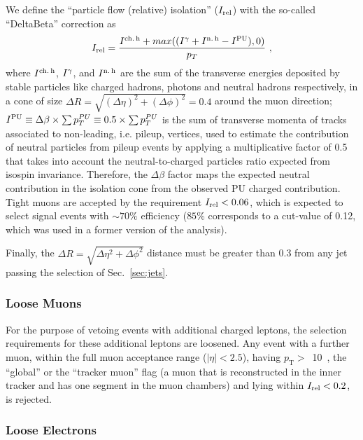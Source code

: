  We define the ``particle flow (relative) isolation'' ($I_{\mathrm{rel}}$) with the so-called ``DeltaBeta'' correction as
 \begin{equation}
 I_{\mathrm{rel}} = \frac{ I^{\mathrm{ch.\,h}} + max((I^{\gamma} + I^{\mathrm{n.\,h}} - I^{\mathrm{PU}}),0)}{p_T}~,
 \label{eq:pfreliso}
 \end{equation}
 where $I^{\mathrm{ch.\,h}}$, $I^{\gamma}$, and $I^{\mathrm{n.\,h}}$ are the sum of the transverse energies deposited by stable particles like charged hadrons, photons and neutral hadrons respectively, in a cone of size $\Delta R = \sqrt{(\Delta\eta)^2+(\Delta\phi)^2} = 0.4$ around the muon direction; $I^{\mathrm{PU}} \equiv \Delta\beta \times \sum p_T^{PU} \equiv 0.5 \times \sum p_T^{PU}$ is the sum of transverse momenta of tracks associated to non-leading, i.e. pileup, vertices, used to estimate the contribution of neutral particles from pileup events by applying a multiplicative factor of 0.5 that takes into account the neutral-to-charged particles ratio expected from isospin invariance. Therefore, the $\Delta\beta$ factor maps the expected neutral contribution in the isolation cone from the observed PU charged contribution. Tight muons are accepted by the requirement $I_{\mathrm{rel}} < 0.06$, which is expected to select signal events with $\sim70\%$ efficiency ($85\%$ corresponds to a cut-value of 0.12, which was used in a former version of the analysis).
 
 Finally, the $\Delta R = \sqrt{\Delta\eta^2+\Delta\phi^2}$ distance must be greater than 0.3 from any jet passing the selection of Sec.~\ref{sec:jets}.
 
 
 
 \subsubsection{Loose Muons}
 
 For the purpose of vetoing events with additional charged leptons, the selection requirements for these additional leptons are loosened. Any event with a further muon, within the full muon acceptance range ($|\eta| < 2.5$), having $p_\mathrm{T} >$~10~\GeV, the ``global'' or the ``tracker muon'' flag (a muon that is reconstructed in the inner tracker and has one segment in the muon chambers) and lying within $I_{\mathrm{rel}} < 0.2$, is rejected. 
 
 
 \subsubsection{Loose Electrons}
 
